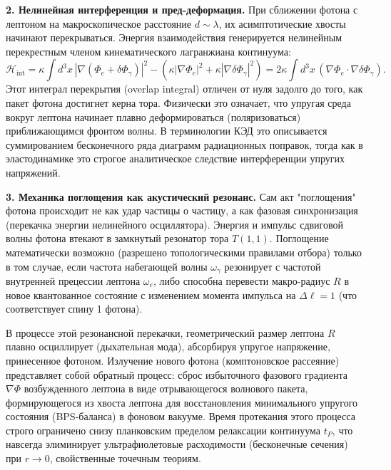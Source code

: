\documentclass[11pt,a4paper]{article}
\begin{document}
	\textbf{2. Нелинейная интерференция и пред-деформация.}
	При сближении фотона с лептоном на макроскопическое расстояние $d \sim \lambda$, их асимптотические хвосты начинают перекрываться. Энергия взаимодействия генерируется нелинейным перекрестным членом кинематического лагранжиана континуума:
	\begin{equation}
		\mathcal{H}_{\text{int}} = \kappa \int d^3x \, \left| \nabla (\Phi_e + \delta \Phi_\gamma) \right|^2 - \left( \kappa |\nabla \Phi_e|^2 + \kappa |\nabla \delta \Phi_\gamma|^2 \right) = 2\kappa \int d^3x \, (\nabla \Phi_e \cdot \nabla \delta \Phi_\gamma).
	\end{equation}
	Этот интеграл перекрытия (overlap integral) отличен от нуля задолго до того, как пакет фотона достигнет керна тора. Физически это означает, что упругая среда вокруг лептона начинает плавно деформироваться (поляризоваться) приближающимся фронтом волны. В терминологии КЭД это описывается суммированием бесконечного ряда диаграмм радиационных поправок, тогда как в эластодинамике это строгое аналитическое следствие интерференции упругих напряжений.
	
	\textbf{3. Механика поглощения как акустический резонанс.}
	Сам акт "поглощения" фотона происходит не как удар частицы о частицу, а как фазовая синхронизация (перекачка энергии нелинейного осциллятора). Энергия и импульс сдвиговой волны фотона втекают в замкнутый резонатор тора $T(1,1)$. 
	Поглощение математически возможно (разрешено топологическими правилами отбора) только в том случае, если частота набегающей волны $\omega_\gamma$ резонирует с частотой внутренней прецессии лептона $\omega_e$, либо способна перевести макро-радиус $R$ в новое квантованное состояние с изменением момента импульса на $\Delta \ell = 1$ (что соответствует спину 1 фотона). 
	
	В процессе этой резонансной перекачки, геометрический размер лептона $R$ плавно осциллирует (дыхательная мода), абсорбируя упругое напряжение, принесенное фотоном. Излучение нового фотона (комптоновское рассеяние) представляет собой обратный процесс: сброс избыточного фазового градиента $\nabla \Phi$ возбужденного лептона в виде отрывающегося волнового пакета, формирующегося из хвоста лептона для восстановления минимального упругого состояния (BPS-баланса) в фоновом вакууме. Время протекания этого процесса строго ограничено снизу планковским пределом релаксации континуума $t_P$, что навсегда элиминирует ультрафиолетовые расходимости (бесконечные сечения) при $r \to 0$, свойственные точечным теориям.
	
\end{document}
